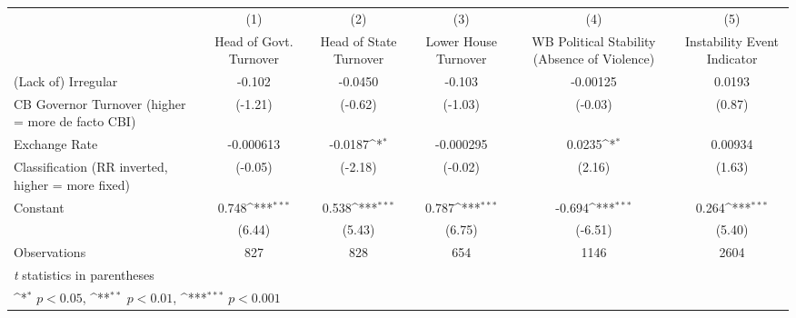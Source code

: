 {
\def\sym#1{\ifmmode^{#1}\else\(^{#1}\)\fi}
\begin{tabular}{l*{5}{c}}
\hline\hline
                    &\multicolumn{1}{c}{(1)}&\multicolumn{1}{c}{(2)}&\multicolumn{1}{c}{(3)}&\multicolumn{1}{c}{(4)}&\multicolumn{1}{c}{(5)}\\
                    &\multicolumn{1}{c}{Head of Govt. Turnover}&\multicolumn{1}{c}{Head of State Turnover}&\multicolumn{1}{c}{Lower House Turnover}&\multicolumn{1}{c}{WB Political Stability (Absence of Violence)}&\multicolumn{1}{c}{Instability Event Indicator}\\
\hline
(Lack of) Irregular &      -0.102         &     -0.0450         &      -0.103         &    -0.00125         &      0.0193         \\
CB Governor Turnover (higher = more de facto CBI)&     (-1.21)         &     (-0.62)         &     (-1.03)         &     (-0.03)         &      (0.87)         \\
[1em]
Exchange Rate       &   -0.000613         &     -0.0187\sym{*}  &   -0.000295         &      0.0235\sym{*}  &     0.00934         \\
Classification (RR inverted, higher = more fixed)&     (-0.05)         &     (-2.18)         &     (-0.02)         &      (2.16)         &      (1.63)         \\
[1em]
Constant            &       0.748\sym{***}&       0.538\sym{***}&       0.787\sym{***}&      -0.694\sym{***}&       0.264\sym{***}\\
                    &      (6.44)         &      (5.43)         &      (6.75)         &     (-6.51)         &      (5.40)         \\
\hline
Observations        &         827         &         828         &         654         &        1146         &        2604         \\
\hline\hline
\multicolumn{6}{l}{\footnotesize \textit{t} statistics in parentheses}\\
\multicolumn{6}{l}{\footnotesize \sym{*} \(p<0.05\), \sym{**} \(p<0.01\), \sym{***} \(p<0.001\)}\\
\end{tabular}
}
